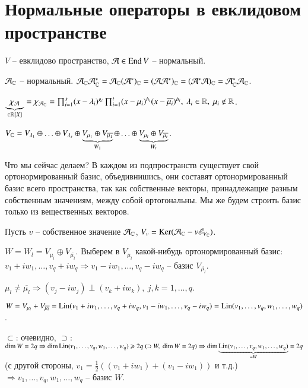 \documentclass[main]{subfiles}
\begin{document}
\chapter{Нормальные операторы в евклидовом пространстве}

$V$ -- евклидово пространство, $\mathcal{A} \in \operatorname{End} V$ -- нормальный.

$\mathcal{A}_{\mathbb{C}}$ -- нормальный. $\mathcal{A}_{\mathbb{C}}\mathcal{A}_{\mathbb{C}}^* = \mathcal{A}_{\mathbb{C}}(\mathcal{A}^*)_{\mathbb{C}} = (\mathcal{A}\mathcal{A}^*)_{\mathbb{C}} = (\mathcal{A}^*\mathcal{A})_{\mathbb{C}} = \mathcal{A}_{\mathbb{C}}^*\mathcal{A}_{\mathbb{C}}$.

$\underbrace{\chi_{\mathcal{A}}}_{\in \mathbb{R}[X]} = \chi_{\mathcal{A}_{\mathbb{C}}} = \prod_{i=1}^s(x - \lambda_i)^{g_i} \prod_{i=1}^t(x - \mu_i)^{h_i} (x - \overline{\mu_i})^{h_i}, \ \lambda_i \in \mathbb{R}, \ \mu_i \not\in \mathbb{R}$.

$V_{\mathbb{C}} = V_{\lambda_1}\oplus\ldots\oplus V_{\lambda_s}\oplus \underbrace{V_{\mu_1}\oplus V_{\overline{\mu_1}}}_{W_1} \oplus \ldots \oplus\underbrace{V_{\mu_t} \oplus V_{\overline{\mu_t}}}_{W_t}$.


Что мы сейчас делаем? В каждом из подпространств существует свой ортонормированный базис, объедивнишись, они составят ортонормированный базис всего пространства, так как собственные векторы, принадлежащие 
разным собственным значениям, между собой ортогональны. Мы же будем строить базис только из вещественных векторов.

Пусть $v$ -- собственное значение $\mathcal{A}_{\mathbb{C}}$, $V_v = \operatorname{Ker} (\mathcal{A}_{\mathbb{C}} - v \mathscr{E}_{V_{\mathbb{C}}})$. 

$W = W_l = V_{\mu_l} \oplus V_{\overline{\mu_l}}$. Выберем в $V_{\mu_l}$ какой-нибудь ортонормированный базис: $v_1 + iw_1, \ldots, v_q + iw_q \Rightarrow
v_1 - iw_1, \ldots, v_q - iw_q$ -- базис $V_{\overline{\mu_l}}$.

$\mu_l \neq \overline{\mu_l} \Rightarrow (v_j - iw_j) \perp (v_k + iw_k), \ j, k = 1, \ldots, q$.

$W = V_{\mu_l} + V_{\overline{\mu_l}} = \operatorname{Lin}(v_1 + iw_1, \ldots, v_q + iw_q, v_1 - iw_1, \ldots, v_q - iw_q) = \operatorname{Lin}(v_1, \ldots, v_q, w_1, \ldots, w_q)$. 

$\subset$: очевидно, $\supset$: $\dim W = 2q \Rightarrow \dim \operatorname{Lin} (v_1, \ldots, v_q, w_1, \ldots, w_q) \geqslant 2q \ (\supset W, \ \dim W = 2q) \Rightarrow
\dim \underbrace{\operatorname{Lin} (v_1, \ldots, v_q, w_1, \ldots, w_q)}_{=W} = 2q$ (с другой стороны, $v_1 = \frac{1}{2}((v_1 + iw_1) + (v_1 - iw_1))$ и т.д.) $\Rightarrow
v_1, \ldots, v_q, w_1, \ldots, w_q$ -- базис $W$.
\end{document}
